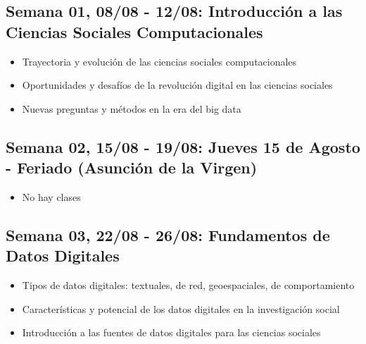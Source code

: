 \documentclass[11pt,letter,]{article}
\providecommand{\tightlist}{%
  \setlength{\itemsep}{0pt}\setlength{\parskip}{0pt}}
\begin{document}
\hypertarget{semana-01-0808---1208-introducciuxf3n-a-las-ciencias-sociales-computacionales}{%
\subsection{Semana 01, 08/08 - 12/08: Introducción a las Ciencias
Sociales
Computacionales}\label{semana-01-0808---1208-introducciuxf3n-a-las-ciencias-sociales-computacionales}}

\begin{itemize}
\tightlist
\item
  Trayectoria y evolución de las ciencias sociales computacionales
\item
  Oportunidades y desafíos de la revolución digital en las ciencias
  sociales
\item
  Nuevas preguntas y métodos en la era del big data
\end{itemize}

\hypertarget{semana-02-1508---1908-jueves-15-de-agosto---feriado-asunciuxf3n-de-la-virgen}{%
\subsection{Semana 02, 15/08 - 19/08: Jueves 15 de Agosto - Feriado
(Asunción de la
Virgen)}\label{semana-02-1508---1908-jueves-15-de-agosto---feriado-asunciuxf3n-de-la-virgen}}

\begin{itemize}
\tightlist
\item
  No hay clases
\end{itemize}

\hypertarget{semana-03-2208---2608-fundamentos-de-datos-digitales}{%
\subsection{Semana 03, 22/08 - 26/08: Fundamentos de Datos
Digitales}\label{semana-03-2208---2608-fundamentos-de-datos-digitales}}

\begin{itemize}
\tightlist
\item
  Tipos de datos digitales: textuales, de red, geoespaciales, de
  comportamiento
\item
  Características y potencial de los datos digitales en la investigación
  social
\item
  Introducción a las fuentes de datos digitales para las ciencias
  sociales
\end{itemize}
\end{document}
